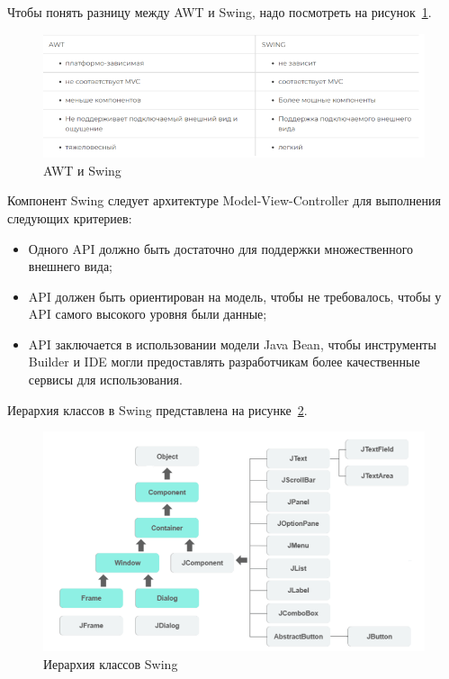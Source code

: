 Чтобы понять разницу между AWT и Swing, надо посмотреть на рисунок~\ref{fig:AWT-Swing-diff}.


\begin{figure}[H]
	\centering
	\includegraphics[width=1\linewidth]{pics/AWT-Swing-diff}
	\caption{AWT и Swing}
	\label{fig:AWT-Swing-diff}
\end{figure}

Компонент Swing следует архитектуре Model-View-Controller для выполнения следующих критериев:
\begin{itemize}
\item Одного API должно быть достаточно для поддержки множественного внешнего вида;
\item API должен быть ориентирован на модель, чтобы не требовалось, чтобы у API самого высокого уровня были данные;
\item API заключается в использовании модели Java Bean, чтобы инструменты Builder и IDE могли предоставлять разработчикам более качественные сервисы для использования.
\end{itemize}

Иерархия классов в Swing представлена на рисунке~\ref{fig:hierarchy}.
\begin{figure}[H]
	\centering
	\includegraphics[width=1\linewidth]{pics/hierarchy}
	\caption{Иерархия классов Swing}
	\label{fig:hierarchy}
\end{figure}


